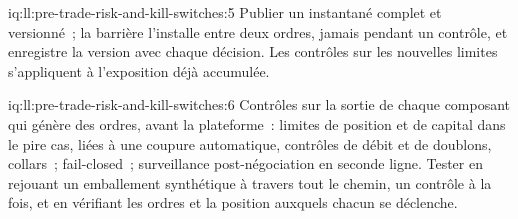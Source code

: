 \begin{solution}{iq:ll:pre-trade-risk-and-kill-switches:5}
Publier un instantané complet et versionné~; la barrière l'installe entre deux ordres, jamais pendant un contrôle, et enregistre la version
avec chaque décision. Les contrôles sur les nouvelles limites s'appliquent à l'exposition déjà accumulée.
\end{solution}

\begin{solution}{iq:ll:pre-trade-risk-and-kill-switches:6}
Contrôles sur la sortie de chaque composant qui génère des ordres, avant la plateforme~: limites de position et de capital dans le pire cas, liées à
une coupure automatique, contrôles de débit et de doublons, collars~; fail-closed~; surveillance post-négociation en seconde ligne. Tester en rejouant un
emballement synthétique à travers tout le chemin, un contrôle à la fois, et en vérifiant les ordres et la position auxquels chacun se déclenche.
\end{solution}
